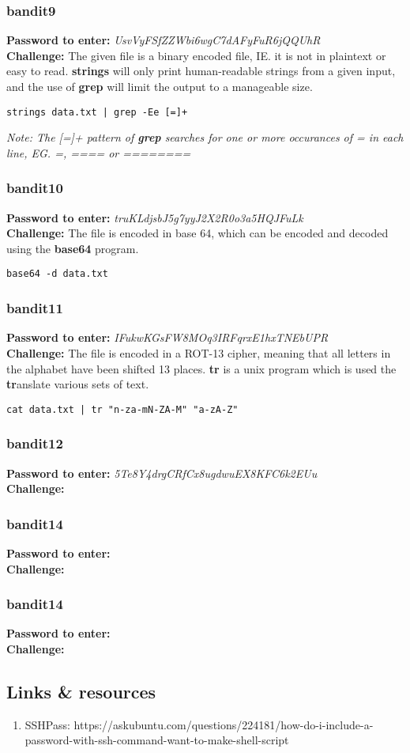 \documentclass[a4paper]{article}
\newcommand{\pass}[1]{\textbf{Password to enter:} \textit{#1}\\}
\newcommand{\chall}{\textbf{Challenge:} }
\begin{document}
\subsubsection{bandit9}
\pass{UsvVyFSfZZWbi6wgC7dAFyFuR6jQQUhR}
\chall The given file is a binary encoded file, IE. it is not in plaintext or easy to read. \textbf{strings} will only print human-readable strings from a given input, and the use of \textbf{grep} will limit the output to a manageable size.
\begin{lstlisting}
strings data.txt | grep -Ee [=]+
\end{lstlisting}
\textit{Note: The [=]+ pattern of \textbf{grep} searches for one or more occurances of \textit{=} in each line, EG. \textit{=}, \textit{====} or \textit{========}}

\subsubsection{bandit10}
\pass{truKLdjsbJ5g7yyJ2X2R0o3a5HQJFuLk}
\chall The file is encoded in base 64, which can be encoded and decoded using the \textbf{base64} program.
\begin{lstlisting}
base64 -d data.txt
\end{lstlisting}

\subsubsection{bandit11}
\pass{IFukwKGsFW8MOq3IRFqrxE1hxTNEbUPR}
\chall The file is encoded in a ROT-13 cipher, meaning that all letters in the alphabet have been shifted 13 places. \textbf{tr} is a unix program which is used the \textbf{tr}anslate various sets of text.
\begin{lstlisting}
cat data.txt | tr "n-za-mN-ZA-M" "a-zA-Z"
\end{lstlisting}

\subsubsection{bandit12}
\pass{5Te8Y4drgCRfCx8ugdwuEX8KFC6k2EUu}
\chall

\subsubsection{bandit14}
\pass{}
\chall

\subsubsection{bandit14}
\pass{}
\chall

\subsection{Links \& resources}
\begin{enumerate}
\item SSHPass: https://askubuntu.com/questions/224181/how-do-i-include-a-password-with-ssh-command-want-to-make-shell-script
\end{enumerate}
\end{document}
